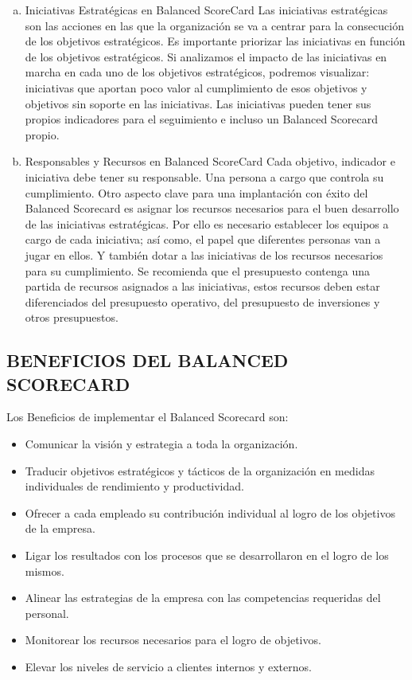 \begin{enumerate}[a)]
\begin{itemize}
    
 		  \end{itemize}


	 \item Iniciativas Estratégicas en Balanced ScoreCard
		Las iniciativas estratégicas son las acciones en las que la organización se va a centrar para la consecución de los objetivos estratégicos. Es importante priorizar las iniciativas en función de los objetivos estratégicos. Si analizamos el impacto de las iniciativas en marcha en cada uno de los objetivos estratégicos, podremos visualizar: iniciativas que aportan poco valor al cumplimiento de esos objetivos y objetivos sin soporte en las iniciativas. Las iniciativas pueden tener sus propios indicadores para el seguimiento e incluso un Balanced Scorecard propio.

	\item Responsables y Recursos en Balanced ScoreCard
		Cada objetivo, indicador e iniciativa debe tener su responsable. Una persona a cargo que controla su cumplimiento.
Otro aspecto clave para una implantación con éxito del Balanced Scorecard es asignar los recursos necesarios para el buen desarrollo de las iniciativas estratégicas. Por ello es necesario establecer los equipos a cargo de cada iniciativa; así como, el papel que diferentes personas van a jugar en ellos. Y también dotar a las iniciativas de los recursos necesarios para su cumplimiento. Se recomienda que el presupuesto contenga una partida de recursos asignados a las iniciativas, estos recursos deben estar diferenciados del presupuesto operativo, del presupuesto de inversiones y otros presupuestos.

    \end{enumerate}


\subsection{ BENEFICIOS DEL BALANCED SCORECARD}

	Los Beneficios de implementar el Balanced Scorecard son:

	\begin{itemize}
   	 \item Comunicar la visión y estrategia a toda la organización.
	\item Traducir objetivos estratégicos y tácticos de la organización en medidas individuales de rendimiento y productividad.
	\item Ofrecer a cada empleado su contribución individual al logro de los objetivos de la empresa.
	\item Ligar los resultados con los procesos que se desarrollaron en el logro de los mismos.
	\item Alinear las estrategias de la empresa con las competencias requeridas del personal.
	\item Monitorear los recursos necesarios para el logro de objetivos.
	\item Elevar los niveles de servicio a clientes internos y externos.
  	 \end{itemize}